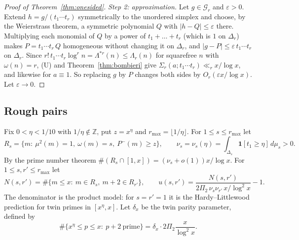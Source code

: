 \documentclass[11pt]{amsart}
\theoremstyle{definition}
\theoremstyle{remark}
\newcommand{\Z}{\mathbb{Z}}
\begin{document}
\begin{proof}[Proof of Theorem~\ref{thm:onesided}]
\emph{Step 2: approximation.} Let $g\in\mathcal G_r$ and $\varepsilon>0$. Extend $h=g/(t_1\cdots t_r)$ symmetrically to the unordered simplex and choose, by the Weierstrass theorem, a symmetric polynomial $Q$ with $|h-Q|\le\varepsilon$ there. Multiplying each monomial of $Q$ by a power of $t_1+\dots+t_r$ (which is $1$ on $\Delta_r$) makes $P=t_1\cdots t_r\,Q$ homogeneous without changing it on $\Delta_r$, and $|g-P|\le\varepsilon\,t_1\cdots t_r$ on $\Delta_r$. Since $r!\,t_1\cdots t_r\log^rn=\Lambda^{*r}(n)\le\Lambda_r(n)$ for squarefree $n$ with $\omega(n)=r$, (U) and Theorem~\ref{thm:bombieri} give $\Sigma_r(a;t_1\cdots t_r)\ll_rx/\log x$, and likewise for $a\equiv1$. So replacing $g$ by $P$ changes both sides by $O_r(\varepsilon x/\log x)$. Let $\varepsilon\to0$.
\end{proof}

\subsection{Rough pairs}
Fix $0<\eta<1/10$ with $1/\eta\notin\Z$, put $z=x^\eta$ and $r_{\max}=\lfloor1/\eta\rfloor$. For $1\le s\le r_{\max}$ let
\[
R_s=\{m:\ \mu^2(m)=1,\ \omega(m)=s,\ P^-(m)\ge z\},\qquad\nu_s=\nu_s(\eta)=\int_{\Delta_s}\mathbf 1[t_1\ge\eta]\,d\mu_s>0 .
\]
By the prime number theorem $\#(R_s\cap[1,x])=(\nu_s+o(1))x/\log x$. For $1\le s,r'\le r_{\max}$ let
\[
N(s,r')=\#\{m\le x:\ m\in R_s,\ m+2\in R_{r'}\},\qquad u(s,r')=\frac{N(s,r')}{2\Pi_2\,\nu_s\nu_{r'}\,x/\log^2x}-1 .
\]
The denominator is the product model: for $s=r'=1$ it is the Hardy--Littlewood prediction for twin primes in $[x^\eta,x]$. Let $\delta_x$ be the twin parity parameter, defined by
\[
\#\{x^\eta\le p\le x:\ p+2\ \text{prime}\}=\delta_x\cdot2\Pi_2\frac{x}{\log^2x}.
\]
\end{document}
